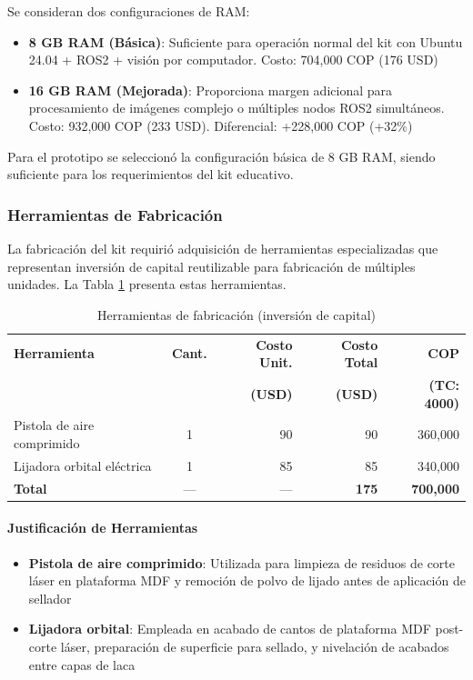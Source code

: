 Se consideran dos configuraciones de RAM:

\begin{itemize}
    \item \textbf{8 GB RAM (Básica)}: Suficiente para operación normal del kit con Ubuntu 24.04 + ROS2 + visión por computador. Costo: 704,000 COP (176 USD)
    \item \textbf{16 GB RAM (Mejorada)}: Proporciona margen adicional para procesamiento de imágenes complejo o múltiples nodos ROS2 simultáneos. Costo: 932,000 COP (233 USD). Diferencial: +228,000 COP (+32\%)
\end{itemize}

Para el prototipo se seleccionó la configuración básica de 8 GB RAM, siendo suficiente para los requerimientos del kit educativo.

\subsubsection{Herramientas de Fabricación}

La fabricación del kit requirió adquisición de herramientas especializadas que representan inversión de capital reutilizable para fabricación de múltiples unidades. La Tabla \ref{tab:herramientas} presenta estas herramientas.

\begin{table}[H]
\centering
\caption{Herramientas de fabricación (inversión de capital)}
\label{tab:herramientas}
\small
\begin{tabular}{|l|c|r|r|r|}
\hline
\textbf{Herramienta} & \textbf{Cant.} & \textbf{Costo Unit.} & \textbf{Costo Total} & \textbf{COP} \\
 & & \textbf{(USD)} & \textbf{(USD)} & \textbf{(TC: 4000)} \\
\hline
Pistola de aire comprimido & 1 & 90 & 90 & 360,000 \\
Lijadora orbital eléctrica & 1 & 85 & 85 & 340,000 \\
\hline
\textbf{Total} & --- & --- & \textbf{175} & \textbf{700,000} \\
\hline
\end{tabular}
\end{table}

\paragraph{Justificación de Herramientas}

\begin{itemize}
    \item \textbf{Pistola de aire comprimido}: Utilizada para limpieza de residuos de corte láser en plataforma MDF y remoción de polvo de lijado antes de aplicación de sellador
    \item \textbf{Lijadora orbital}: Empleada en acabado de cantos de plataforma MDF post-corte láser, preparación de superficie para sellado, y nivelación de acabados entre capas de laca
\end{itemize}


